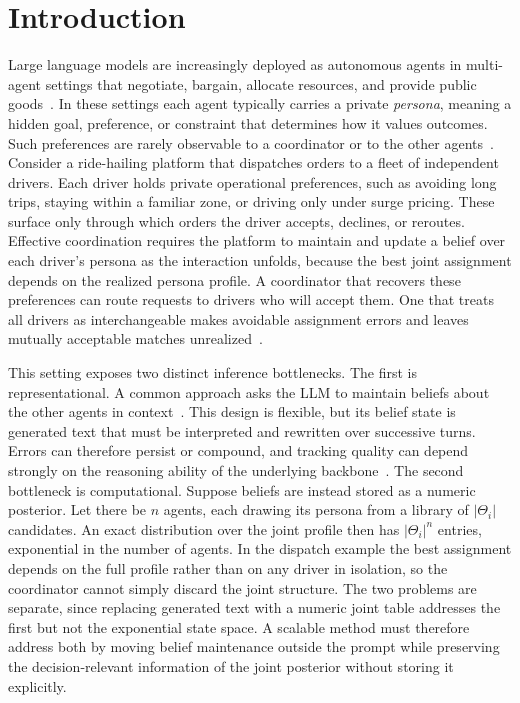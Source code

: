 \documentclass[letterpaper]{article} %
\begin{document}
\section{Introduction}
\label{sec:intro}

Large language models are increasingly deployed as autonomous agents in multi-agent settings that negotiate, bargain, allocate resources, and provide public goods~\citep{wu2023autogen,li2023camel,hong2024metagpt,park2023generative,meta2022human}. In these settings each agent typically carries a private \emph{persona}, meaning a hidden goal, preference, or constraint that determines how it values outcomes. Such preferences are rarely observable to a coordinator or to the other agents~\citep{zhou2024sotopia,abdulhai2023lmrl}. Consider a ride-hailing platform that dispatches orders to a fleet of independent drivers. Each driver holds private operational preferences, such as avoiding long trips, staying within a familiar zone, or driving only under surge pricing. These surface only through which orders the driver accepts, declines, or reroutes. Effective coordination requires the platform to maintain and update a belief over each driver's persona as the interaction unfolds, because the best joint assignment depends on the realized persona profile. A coordinator that recovers these preferences can route requests to drivers who will accept them. One that treats all drivers as interchangeable makes avoidable assignment errors and leaves mutually acceptable matches unrealized~\citep{mu2026adaptive,yi2025debate}.

This setting exposes two distinct inference bottlenecks. The first is representational. A common approach asks the LLM to maintain beliefs about the other agents in context~\citep{yi2025debate,mu2026adaptive}. This design is flexible, but its belief state is generated text that must be interpreted and rewritten over successive turns. Errors can therefore persist or compound, and tracking quality can depend strongly on the reasoning ability of the underlying backbone~\citep{park2024llm}. The second bottleneck is computational. Suppose beliefs are instead stored as a numeric posterior. Let there be $n$ agents, each drawing its persona from a library of $|\Theta_i|$ candidates. An exact distribution over the joint profile then has $|\Theta_i|^n$ entries, exponential in the number of agents. In the dispatch example the best assignment depends on the full profile rather than on any driver in isolation, so the coordinator cannot simply discard the joint structure. The two problems are separate, since replacing generated text with a numeric joint table addresses the first but not the exponential state space. A scalable method must therefore address both by moving belief maintenance outside the prompt while preserving the decision-relevant information of the joint posterior without storing it explicitly.
\end{document}
